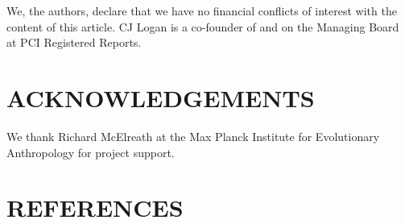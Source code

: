 \documentclass[
]{article}
\begin{document}
We, the authors, declare that we have no financial conflicts of interest
with the content of this article. CJ Logan is a co-founder of and on the
Managing Board at PCI Registered Reports.

\hypertarget{acknowledgements}{%
\section{ACKNOWLEDGEMENTS}\label{acknowledgements}}

We thank Richard McElreath at the Max Planck Institute for Evolutionary
Anthropology for project support.

\hypertarget{references}{%
\section*{REFERENCES}\label{references}}
\end{document}
